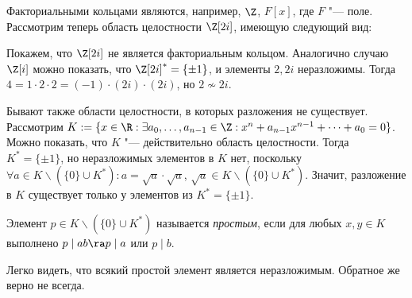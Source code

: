 \begin{example}
	Факториальными кольцами являются, например, $\Z$, $F[x]$, где $F$ "--- поле. Рассмотрим теперь область целостности $\Z[2i]$, имеющую следующий вид:
	\begin{center}
	\end{center}
	
	Покажем, что $\Z[2i]$ не является факториальным кольцом. Аналогично случаю $\Z[i]$ можно показать, что $\Z[2i]^* = \{\pm1\}$, и элементы $2, 2i$ неразложимы. Тогда $4 = 1 \cdot 2 \cdot 2 = (-1)\cdot (2i) \cdot (2i)$, но $2 \not\sim 2i$.
\end{example}

\begin{note}
	Бывают также области целостности, в которых разложения не существует. Рассмотрим $K := \{x \in \R: \exists a_0, \dotsc, a_{n - 1} \in \Z: x^n + a_{n-1}x^{n-1} + \dotsb + a_0 = 0\}$. Можно показать, что $K$ "--- действительно область целостности. Тогда $K^* = \{\pm1\}$, но неразложимых элементов в $K$ нет, поскольку $\forall a \in K \backslash (\{0\} \cup K^*): a = \sqrt{a} \cdot \sqrt{a}$, $\sqrt{a} \in K \backslash (\{0\} \cup K^*)$. Значит, разложение в $K$ существует только у элементов из $K^* = \{\pm1\}$.
\end{note}

\begin{definition}
	Элемент $p \in K \backslash (\{0\} \cup K^*)$ называется \textit{простым}, если для любых $x, y \in K$ выполнено $p \mid ab \ra p \mid a$ или $p \mid b$.
\end{definition}

\begin{note}
	Легко видеть, что всякий простой элемент является неразложимым. Обратное же верно не всегда.
\end{note}

